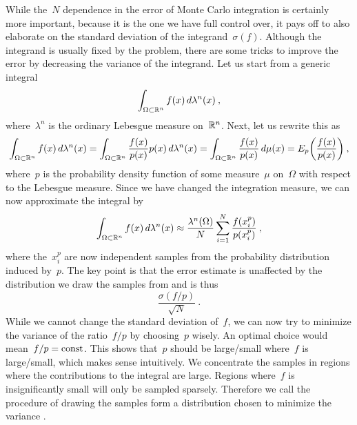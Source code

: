 While the~$N$ dependence in the error of Monte Carlo integration is certainly
more important, because it is the one we have full control over, it pays off to
also elaborate on the standard deviation of the integrand~$\sigma(f)$. Although
the integrand is usually fixed by the problem, there are some tricks to improve
the error by decreasing the variance of the integrand. Let us start from a
generic integral
%
\begin{equation}
  \int_{\Omega \subset \mathbb{R}^n} f(x) \,d\lambda^n(x)\:,
\end{equation}
%
where~$\lambda^n$ is the ordinary Lebesgue measure on~$\mathbb{R}^n$. Next, let us
rewrite this as
%
\begin{equation}
  \int_{\Omega \subset \mathbb{R}^n} f(x) \,d\lambda^n(x) =
    \int_{\Omega \subset \mathbb{R}^n} \frac{f(x)}{p(x)} p(x) \,d\lambda^n(x) =
    \int_{\Omega \subset \mathbb{R}^n} \frac{f(x)}{p(x)} \,d\mu(x) =
    E_{p}\biggl(\frac{f(x)}{p(x)}\biggr) \:,
\end{equation}
%
where~$p$ is the probability density function of some measure~$\mu$ on~$\Omega$
with respect to the Lebesgue measure.  Since we have changed the integration
measure, we can now approximate the integral by
%
\begin{equation}
  \int_{\Omega \subset \mathbb{R}^n} f(x) \,d\lambda^n(x) \approx
  \frac{\lambda^n(\Omega)}{N} \sum_{i=1}^N \frac{f(x_i^p)}{p(x_i^p)}\:,
\end{equation}
%
where the~$x_i^p$ are now independent samples from the probability distribution
induced by~$p$. The key point is that the error estimate is unaffected by the
distribution we draw the samples from and is thus
%
\begin{equation}
  \frac{\sigma(f/p)}{\sqrt{N}} \:.
\end{equation}
%
While we cannot change the standard deviation of~$f$, we can now try to
minimize the variance of the ratio~$f/p$ by choosing~$p$ wisely. An optimal
choice would mean~$f/p = \mathrm{const}$. This shows that~$p$ should be large/small
where~$f$ is large/small, which makes sense intuitively. We concentrate the
samples in regions where the contributions to the integral are large. Regions
where~$f$ is insignificantly small will only be sampled sparsely. Therefore we
call the procedure of drawing the samples form a distribution chosen to minimize
the variance .

